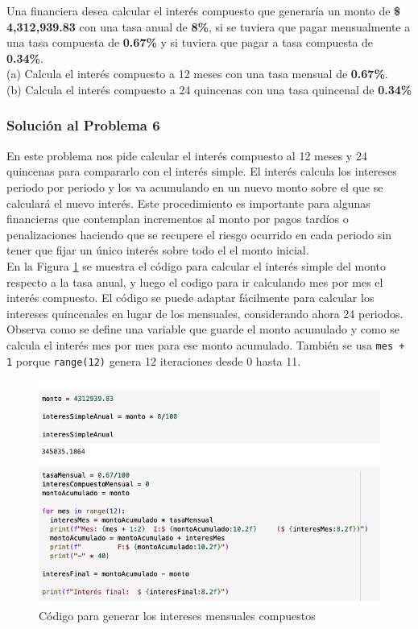 \documentclass{article}
\begin{document}
Una financiera desea calcular el interés compuesto que generaría un monto de \textbf{\$ 4,312,939.83} con una tasa anual de \textbf{8\%}, si se tuviera que pagar mensualmente a una tasa compuesta de \textbf{0.67\%} y si tuviera que pagar a tasa compuesta de \textbf{0.34\%}.
\\[12pt]
(a) Calcula el interés compuesto a 12 meses con una tasa mensual de \textbf{0.67\%}. 
\\[6pt]
(b) Calcula el interés compuesto a 24 quincenas con una tasa quincenal de \textbf{0.34\%}

\clearpage

\subsubsection*{Solución al Problema 6}

En este problema nos pide calcular el interés compuesto al 12 meses y 24 quincenas para compararlo con el interés simple. El interés calcula los intereses periodo por periodo y los va acumulando en un nuevo monto sobre el que se calculará el nuevo interés. Este procedimiento es importante para algunas financieras que contemplan incrementos al monto por pagos tardíos o penalizaciones haciendo que se recupere el riesgo ocurrido en cada periodo sin tener que fijar un único interés sobre todo el el monto inicial.
\\[12pt]
En la Figura \ref{fig:s106-1} se muestra el código para calcular el interés simple del monto respecto a la tasa anual, y luego el codigo para ir calculando mes por mes el interés compuesto. El código se puede adaptar fácilmente para calcular los intereses quincenales en lugar de los mensuales, considerando ahora 24 periodos. Observa como se define una variable que guarde el monto acumulado y como se calcula el interés mes por mes para ese monto acumulado. También se usa \texttt{mes + 1} porque \texttt{range(12)} genera 12 iteraciones desde 0 hasta 11.
\begin{figure}[!ht]
    \centering
    \begin{minipage}{\textwidth}
        \centering
        \includegraphics[width=\textwidth]{figures/s106-1.png}
    \end{minipage}
    \captionsetup{width=0.9\textwidth}
    \caption{Código para generar los intereses mensuales compuestos}
    \label{fig:s106-1}
\end{figure}
\end{document}
